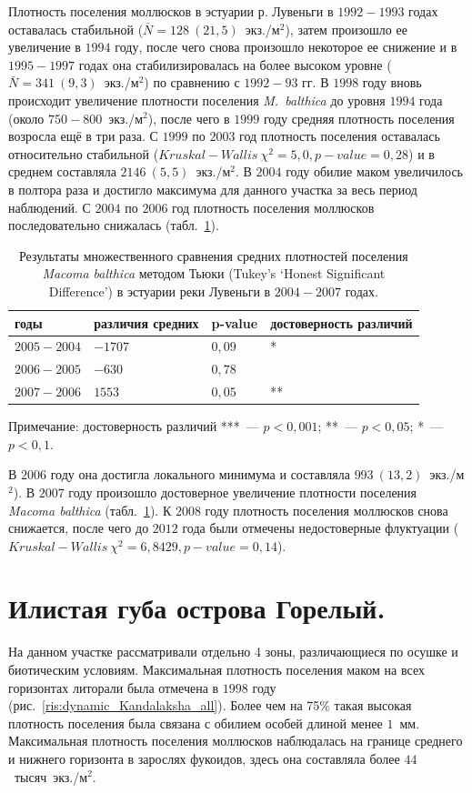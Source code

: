 Плотность поселения моллюсков в эстуарии р. Лувеньги в $1992-1993$ годах оставалась стабильной ($\bar{N} = 128~(21,5)$~экз./м$^2$), затем произошло ее увеличение в $1994$ году, после чего снова произошло некоторое ее снижение и в $1995 - 1997$ годах она стабилизировалась на более высоком уровне ($\bar{N} = 341~(9,3)$~экз./м$^2$) по сравнению с $1992 - 93$ гг.
В $1998$ году вновь происходит увеличение плотности поселения {\it M.~balthica} до уровня $1994$ года (около $750 - 800$~экз./м$^2$), после чего в $1999$ году средняя плотность поселения возросла ещё в три раза.
С $1999$ по $2003$ год плотность поселения оставалась относительно стабильной  ($Kruskal-Wallis\ \chi^2 = 5,0, p-value = 0,28$) и в среднем составляла $2146~(5,5)$~экз./м$^2$.
В $2004$ году обилие маком увеличилось в полтора раза и достигло максимума для данного участка за весь период наблюдений. 
С $2004$ по $2006$ год плотность поселения моллюсков последовательно снижалась (табл.~\ref {tab:Tukey_estuary_04_07_n2}). 
	\begin{table}[p]
	\caption{Результаты множественного сравнения средних плотностей поселения {\it Macoma balthica} методом Тьюки (Tukey's ‘Honest Significant Difference’) в эстуарии реки Лувеньги в $2004-2007$ годах.}
	\label{tab:Tukey_estuary_04_07_n2}
	\begin{tabularx}{\textwidth}{|*{4}{X|}} \hline
	годы & различия средних & p-value & достоверность различий\\
	\hline
	$2005-2004$ & $-1707$ & $0,09$ & *\\
	\hline
	$2006-2005$ & $-630$ & $0,78$ & \\
	\hline
	$2007-2006$ & $1553$ & $0,05$ & **\\
	\hline
	\end{tabularx}

	{\footnotesize Примечание: достоверность различий ***~--- $p<0,001$; **~--- $p<0,05$; *~--- $p<0,1$.}
	\end{table}
В $2006$ году она достигла локального минимума и составляла $993~(13,2)$~экз./м$^2$). 
В $2007$ году произошло достоверное увеличение плотности поселения {\it Macoma balthica} (табл.~\ref {tab:Tukey_estuary_04_07_n2}).
К $2008$ году плотность поселения моллюсков снова снижается, после чего до $2012$ года были отмечены недостоверные флуктуации ($Kruskal-Wallis\ \chi^2 = 6,8429, p-value = 0,14$).

		\section{Илистая губа острова Горелый.}
На данном участке рассматривали отдельно 4 зоны, различающиеся по осушке и биотическим условиям. 
Максимальная плотность поселения маком на всех горизонтах литорали была отмечена в $1998$ году (рис.~\ref{ris:dynamic_Kandalaksha_all}).
Более чем на 75\% такая высокая плотность поселения была связана с обилием особей длиной менее $1$~мм.
Максимальная плотность поселения моллюсков наблюдалась на границе среднего и нижнего горизонта в зарослях фукоидов, здесь она составляла более $44$~тысяч~экз./м$^2$.

